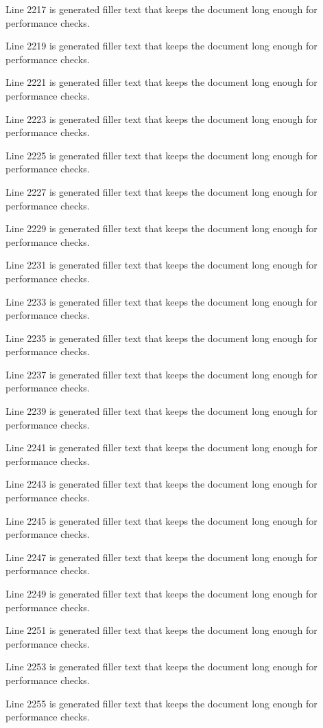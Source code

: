 Line 2217 is generated filler text that keeps the document long enough for performance checks.

Line 2219 is generated filler text that keeps the document long enough for performance checks.

Line 2221 is generated filler text that keeps the document long enough for performance checks.

Line 2223 is generated filler text that keeps the document long enough for performance checks.

Line 2225 is generated filler text that keeps the document long enough for performance checks.

Line 2227 is generated filler text that keeps the document long enough for performance checks.

Line 2229 is generated filler text that keeps the document long enough for performance checks.

Line 2231 is generated filler text that keeps the document long enough for performance checks.

Line 2233 is generated filler text that keeps the document long enough for performance checks.

Line 2235 is generated filler text that keeps the document long enough for performance checks.

Line 2237 is generated filler text that keeps the document long enough for performance checks.

Line 2239 is generated filler text that keeps the document long enough for performance checks.

Line 2241 is generated filler text that keeps the document long enough for performance checks.

Line 2243 is generated filler text that keeps the document long enough for performance checks.

Line 2245 is generated filler text that keeps the document long enough for performance checks.

Line 2247 is generated filler text that keeps the document long enough for performance checks.

Line 2249 is generated filler text that keeps the document long enough for performance checks.

Line 2251 is generated filler text that keeps the document long enough for performance checks.

Line 2253 is generated filler text that keeps the document long enough for performance checks.

Line 2255 is generated filler text that keeps the document long enough for performance checks.

